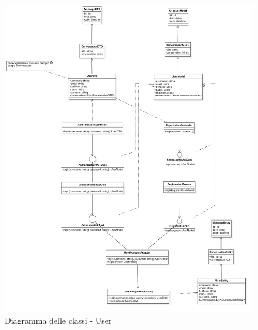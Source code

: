     \begin{figure}[H]
        \centering
        \includegraphics[width=\linewidth, height=0.8\textheight, keepaspectratio]{./img/png/Model5!User_5.png}
        \caption{Diagramma delle classi - User}
        \label{fig:user}
    \end{figure}

